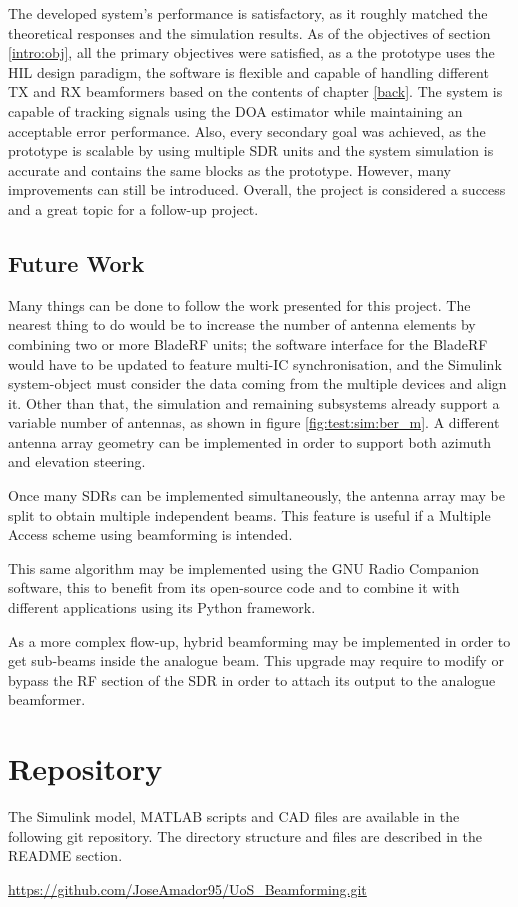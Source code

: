 \documentclass[12pt,a4paper]{report}
\begin{document}
The developed system's performance is satisfactory, as it roughly matched the theoretical responses and the simulation results. As of the objectives of section \ref{intro:obj}, all the primary objectives were satisfied, as a the prototype uses the HIL design paradigm, the software is flexible and capable of handling different TX and RX beamformers based on the contents of chapter \ref{back}. The system is capable of tracking signals using the DOA estimator while maintaining an acceptable error performance. Also, every secondary goal was achieved, as the prototype is scalable by using multiple SDR units and the system simulation is accurate and contains the same blocks as the prototype. However, many improvements can still be introduced. Overall, the project is considered a success and a great topic for a follow-up project. 

\section{Future Work} \label{conc:future}
Many things can be done to follow the work presented for this project. The nearest thing to do would be to increase the number of antenna elements by combining two or more BladeRF units; the software interface for the BladeRF would have to be updated to feature multi-IC synchronisation, and the Simulink system-object must consider the data coming from the multiple devices and align it. Other than that, the simulation and remaining subsystems already support a variable number of antennas, as shown in figure \ref{fig:test:sim:ber_m}. A different antenna array geometry can be implemented in order to support both azimuth and elevation steering.

Once many SDRs can be implemented simultaneously, the antenna array may be split to obtain multiple independent beams. This feature is useful if a Multiple Access scheme using beamforming is intended. 

This same algorithm may be implemented using the GNU Radio Companion software, this to benefit from its open-source code and to combine it with different applications using its Python framework.

As a more complex flow-up, hybrid beamforming may be implemented in order to get sub-beams inside the analogue beam. This upgrade may require to modify or bypass the RF section of the SDR in order to attach its output to the analogue beamformer.

\appendix
\chapter{Repository} \label{appendix}
The Simulink model, MATLAB scripts and CAD files are available in the following git repository. The directory structure and files are described in the README section.

\url{https://github.com/JoseAmador95/UoS_Beamforming.git}




\end{document}
